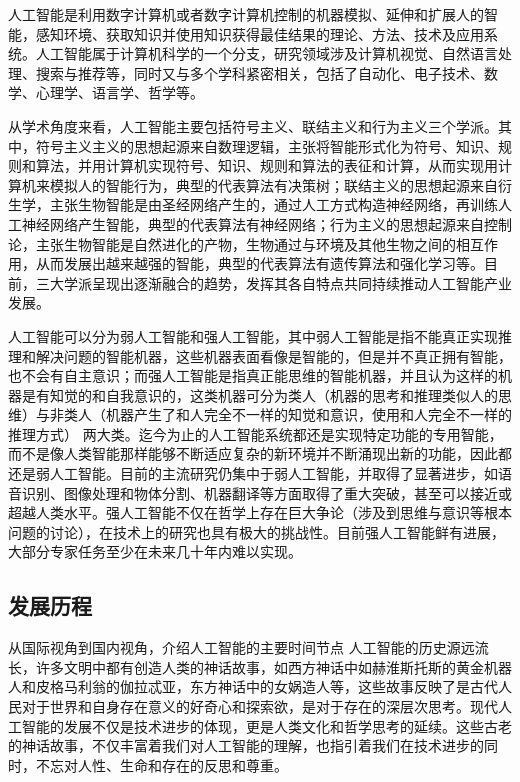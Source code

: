 人工智能是利用数字计算机或者数字计算机控制的机器模拟、延伸和扩展人的智能，感知环境、获取知识并使用知识获得最佳结果的理论、方法、技术及应用系统。人工智能属于计算机科学的一个分支，研究领域涉及计算机视觉、自然语言处理、搜索与推荐等，同时又与多个学科紧密相关，包括了自动化、电子技术、数学、心理学、语言学、哲学等。

从学术角度来看，人工智能主要包括符号主义、联结主义和行为主义三个学派。其中，符号主义主义的思想起源来自数理逻辑，主张将智能形式化为符号、知识、规则和算法，并用计算机实现符号、知识、规则和算法的表征和计算，从而实现用计算机来模拟人的智能行为，典型的代表算法有决策树；联结主义的思想起源来自衍生学，主张生物智能是由圣经网络产生的，通过人工方式构造神经网络，再训练人工神经网络产生智能，典型的代表算法有神经网络；行为主义的思想起源来自控制论，主张生物智能是自然进化的产物，生物通过与环境及其他生物之间的相互作用，从而发展出越来越强的智能，典型的代表算法有遗传算法和强化学习等。目前，三大学派呈现出逐渐融合的趋势，发挥其各自特点共同持续推动人工智能产业发展。

人工智能可以分为弱人工智能和强人工智能，其中弱人工智能是指不能真正实现推理和解决问题的智能机器，这些机器表面看像是智能的，但是并不真正拥有智能，也不会有自主意识；而强人工智能是指真正能思维的智能机器，并且认为这样的机器是有知觉的和自我意识的，这类机器可分为类人（机器的思考和推理类似人的思维）与非类人（机器产生了和人完全不一样的知觉和意识，使用和人完全不一样的推理方式） 两大类。迄今为止的人工智能系统都还是实现特定功能的专用智能，而不是像人类智能那样能够不断适应复杂的新环境并不断涌现出新的功能，因此都还是弱人工智能。目前的主流研究仍集中于弱人工智能，并取得了显著进步，如语音识别、图像处理和物体分割、机器翻译等方面取得了重大突破，甚至可以接近或超越人类水平。强人工智能不仅在哲学上存在巨大争论（涉及到思维与意识等根本问题的讨论），在技术上的研究也具有极大的挑战性。目前强人工智能鲜有进展，大部分专家任务至少在未来几十年内难以实现。

\subsection{发展历程}
从国际视角到国内视角，介绍人工智能的主要时间节点
人工智能的历史源远流长，许多文明中都有创造人类的神话故事，如西方神话中如赫淮斯托斯的黄金机器人和皮格马利翁的伽拉忒亚，东方神话中的女娲造人等，这些故事反映了是古代人民对于世界和自身存在意义的好奇心和探索欲，是对于存在的深层次思考。现代人工智能的发展不仅是技术进步的体现，更是人类文化和哲学思考的延续。这些古老的神话故事，不仅丰富着我们对人工智能的理解，也指引着我们在技术进步的同时，不忘对人性、生命和存在的反思和尊重。

